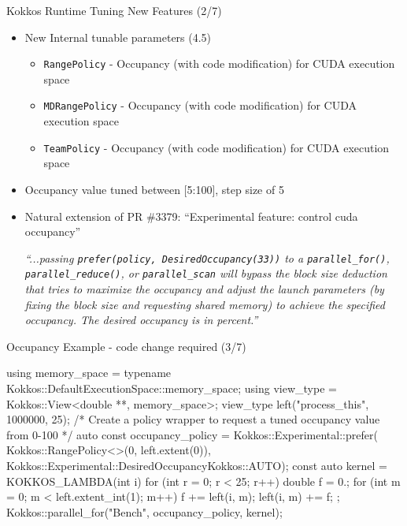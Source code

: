 \begin{frame}[fragile]{Kokkos Runtime Tuning New Features (2/7)}
  \begin{itemize}
      \item New Internal tunable parameters (4.5)
      \begin{itemize}
        \item \texttt{RangePolicy} - Occupancy (with code modification) for CUDA execution space
        \item \texttt{MDRangePolicy} - Occupancy (with code modification) for CUDA execution space
        \item \texttt{TeamPolicy} - Occupancy (with code modification) for CUDA execution space
      \end{itemize}
      \item Occupancy value tuned between [5:100], step size of 5
      \item Natural extension of PR \#3379: ``Experimental feature: control cuda occupancy''
      \begin{block}{}
          \textit{``...passing \texttt{prefer(policy, DesiredOccupancy(33))} to a \texttt{parallel\_for()}, \texttt{parallel\_reduce()}, or \texttt{parallel\_scan} will bypass the block size deduction that tries to maximize the occupancy and adjust the launch parameters (by fixing the block size and requesting shared memory) to achieve the specified occupancy. The desired occupancy is in percent.''}
      \end{block}
  \end{itemize}
\end{frame}

\begin{frame}[fragile]{Occupancy Example - code change required (3/7)}
    \begin{code}[keywords={std}]
    using memory_space = typename Kokkos::DefaultExecutionSpace::memory_space;
    using view_type = Kokkos::View<double **, memory_space>;
    view_type left("process_this", 1000000, 25);
    /* Create a policy wrapper to request a tuned occupancy value from 0-100 */
    auto const occupancy_policy = Kokkos::Experimental::prefer(
        Kokkos::RangePolicy<>(0, left.extent(0)),
        Kokkos::Experimental::DesiredOccupancy{Kokkos::AUTO});
    const auto kernel = KOKKOS_LAMBDA(int i) {
            for (int r = 0; r < 25; r++) {
                double f = 0.;
                for (int m = 0; m < left.extent_int(1); m++) {
                    f += left(i, m);
                    left(i, m) += f;
                }
            }
        };
    Kokkos::parallel_for("Bench", occupancy_policy, kernel);
    \end{code}
\end{frame}

